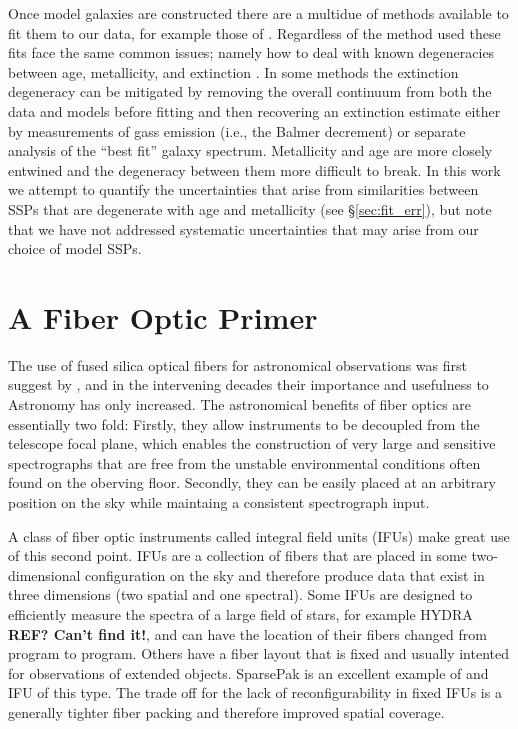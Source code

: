 Once model galaxies are constructed there are a multidue of methods
available to fit them to our data, for example those of
\citep{Cappellari04, Tojeiro07,Chen12, CidFernandes05, Ocvirk06,
  Wilkinson15, Sanchez16}. Regardless of the method used these fits
face the same common issues; namely how to deal with known
degeneracies between age, metallicity, and extinction
\citep{Oconnel76,Aaronson78,Worthey94,dePaz02}. In some methods the
extinction degeneracy can be mitigated by removing the overall
continuum from both the data and models before fitting
\citep[e.g.,][]{Ocvirk06,Wilkinson15} and then recovering an
extinction estimate either by measurements of gass emission (i.e., the
Balmer decrement) or separate analysis of the ``best fit'' galaxy
spectrum. Metallicity and age are more closely entwined and the
degeneracy between them more difficult to break. In this work we
attempt to quantify the uncertainties that arise from similarities
between SSPs that are degenerate with age and metallicity (see
\S\ref{sec:fit_err}), but note that we have not addressed systematic
uncertainties that may arise from our choice of model SSPs.

\section{A Fiber Optic Primer}
\label{intro:sec:fiber}
The use of fused silica optical fibers for astronomical observations
was first suggest by \citet{Angel77}, and in the intervening decades
their importance and usefulness to Astronomy has only increased. The
astronomical benefits of fiber optics are essentially two fold:
Firstly, they allow instruments to be decoupled from the telescope
focal plane, which enables the construction of very large and
sensitive spectrographs that are free from the unstable environmental
conditions often found on the oberving floor. Secondly, they can be
easily placed at an arbitrary position on the sky while maintaing a
consistent spectrograph input.

A class of fiber optic instruments called integral field units (IFUs)
make great use of this second point. IFUs are a collection of fibers
that are placed in some two-dimensional configuration on the sky and
therefore produce data that exist in three dimensions (two spatial and
one spectral). Some IFUs are designed to efficiently measure the
spectra of a large field of stars, for example HYDRA {\bf REF? Can't
  find it!}, and can have the location of their fibers changed from
program to program. Others have a fiber layout that is fixed and
usually intented for observations of extended objects. SparsePak
\citep{Bershady04,Bershady05} is an excellent example of and IFU of
this type. The trade off for the lack of reconfigurability in fixed
IFUs is a generally tighter fiber packing and therefore improved
spatial coverage.


